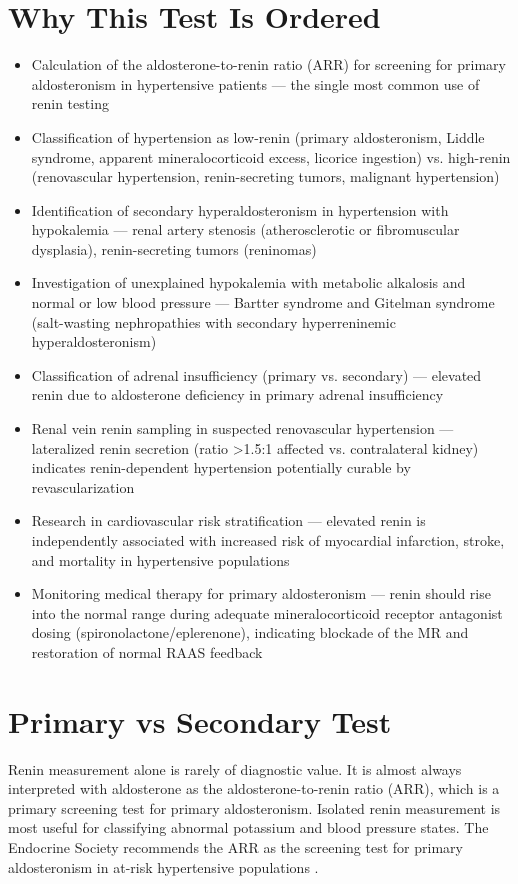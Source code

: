 \section*{Why This Test Is Ordered}
\begin{itemize}
  \item Calculation of the aldosterone-to-renin ratio (ARR) for screening for primary aldosteronism in hypertensive patients --- the single most common use of renin testing
  \item Classification of hypertension as low-renin (primary aldosteronism, Liddle syndrome, apparent mineralocorticoid excess, licorice ingestion) vs. high-renin (renovascular hypertension, renin-secreting tumors, malignant hypertension)
  \item Identification of secondary hyperaldosteronism in hypertension with hypokalemia --- renal artery stenosis (atherosclerotic or fibromuscular dysplasia), renin-secreting tumors (reninomas)
  \item Investigation of unexplained hypokalemia with metabolic alkalosis and normal or low blood pressure --- Bartter syndrome and Gitelman syndrome (salt-wasting nephropathies with secondary hyperreninemic hyperaldosteronism)
  \item Classification of adrenal insufficiency (primary vs. secondary) --- elevated renin due to aldosterone deficiency in primary adrenal insufficiency
  \item Renal vein renin sampling in suspected renovascular hypertension --- lateralized renin secretion (ratio >1.5:1 affected vs. contralateral kidney) indicates renin-dependent hypertension potentially curable by revascularization
  \item Research in cardiovascular risk stratification --- elevated renin is independently associated with increased risk of myocardial infarction, stroke, and mortality in hypertensive populations
  \item Monitoring medical therapy for primary aldosteronism --- renin should rise into the normal range during adequate mineralocorticoid receptor antagonist dosing (spironolactone/eplerenone), indicating blockade of the MR and restoration of normal RAAS feedback
\end{itemize}

\section*{Primary vs Secondary Test}
Renin measurement alone is rarely of diagnostic value. It is almost always interpreted with aldosterone as the aldosterone-to-renin ratio (ARR), which is a primary screening test for primary aldosteronism. Isolated renin measurement is most useful for classifying abnormal potassium and blood pressure states. The Endocrine Society recommends the ARR as the screening test for primary aldosteronism in at-risk hypertensive populations \cite{funder2016management}.

